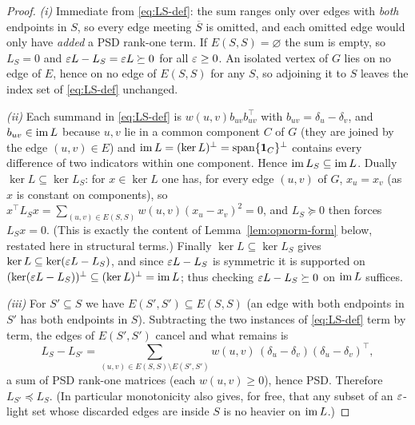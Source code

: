 \begin{proof}
\emph{(i)} Immediate from \eqref{eq:LS-def}: the sum ranges only over edges with
\emph{both} endpoints in $S$, so every edge meeting $\overline S$ is omitted, and
each omitted edge would only have \emph{added} a PSD rank-one term. If
$E(S,S)=\varnothing$ the sum is empty, so $L_S=0$ and $\varepsilon L-L_S=\varepsilon
L\succeq0$ for all $\varepsilon\ge0$. An isolated vertex of $G$ lies on no edge of
$E$, hence on no edge of $E(S,S)$ for any $S$, so adjoining it to $S$ leaves the
index set of \eqref{eq:LS-def} unchanged.

\emph{(ii)} Each summand in \eqref{eq:LS-def} is $w(u,v)b_{uv}b_{uv}^{\!\top}$ with
$b_{uv}=\delta_u-\delta_v$, and $b_{uv}\in\operatorname{im} L$ because $u,v$ lie in a common
component $C$ of $G$ (they are joined by the edge $(u,v)\in E$) and
$\operatorname{im} L=(\ker L)^\perp=\operatorname{span}\{\mathbf 1_C\}^\perp$ contains every difference
of two indicators within one component. Hence $\operatorname{im} L_S\subseteq\operatorname{im} L$.
Dually $\ker L\subseteq\ker L_S$: for $x\in\ker L$ one has, for every edge
$(u,v)$ of $G$, $x_u=x_v$ (as $x$ is constant on components), so
$x^{\!\top}L_Sx=\sum_{(u,v)\in E(S,S)}w(u,v)(x_u-x_v)^2=0$, and $L_S\succeq0$ then
forces $L_Sx=0$. \textup{(}This is exactly the content of
Lemma~\ref{lem:opnorm-form} below, restated here in structural terms.\textup{)}
Finally $\ker L\subseteq\ker L_S$ gives $\ker L\subseteq\ker(\varepsilon L-L_S)$, and
since $\varepsilon L-L_S$ is symmetric it is supported on
$(\ker(\varepsilon L-L_S))^\perp\subseteq(\ker L)^\perp=\operatorname{im} L$; thus checking
$\varepsilon L-L_S\succeq0$ on $\operatorname{im} L$ suffices.

\emph{(iii)} For $S'\subseteq S$ we have $E(S',S')\subseteq E(S,S)$ (an edge with
both endpoints in $S'$ has both endpoints in $S$). Subtracting the two instances
of \eqref{eq:LS-def} term by term, the edges of $E(S',S')$ cancel and what
remains is
\[
  L_S-L_{S'}
   =\sum_{(u,v)\in E(S,S)\setminus E(S',S')}w(u,v)\,(\delta_u-\delta_v)(\delta_u-\delta_v)^{\!\top},
\]
a sum of PSD rank-one matrices (each $w(u,v)\ge0$), hence PSD. Therefore
$L_{S'}\preceq L_S$. \textup{(}In particular monotonicity also gives, for free,
that any subset of an $\varepsilon$-light set whose discarded edges are inside $S$ is
no heavier on $\operatorname{im} L$.\textup{)}
\end{proof}

